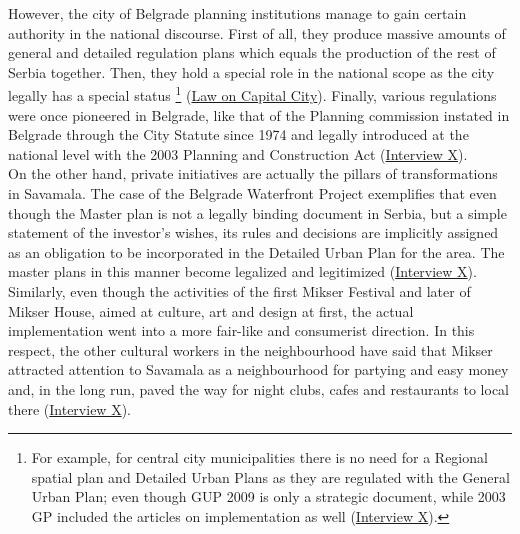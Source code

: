 \documentclass[11pt]{report}
\begin{document}
However, the city of Belgrade planning institutions manage to gain certain authority in the national discourse.
First of all, they produce massive amounts of general and detailed regulation plans which equals the production of the rest of Serbia together.
Then, they hold a special role in the national scope as the city legally has a special status
\footnote
{For example, for central city municipalities there is no need for a Regional spatial plan and Detailed Urban Plans as they are regulated with the General Urban Plan; even though GUP 2009 is only a strategic document, while 2003 GP included the articles on implementation as well (\href{InterviewX}{Interview X}).}
(\href{ref}{Law on Capital City}).
Finally, various regulations were once pioneered in Belgrade, like that of the Planning commission instated in Belgrade through the City Statute since 1974 and legally introduced at the national level with the 2003 Planning and Construction Act (\href{InterviewX}{Interview X}).
\\

On the other hand, private initiatives are actually the pillars of transformations in Savamala. The case of the Belgrade Waterfront Project exemplifies that even though the Master plan is not a legally binding document in Serbia, but a simple statement of the investor’s wishes, its rules and decisions are implicitly assigned as an obligation to be incorporated in the Detailed Urban Plan for the area. The master plans in this manner become legalized and legitimized (\href{InterviewX}{Interview X}).
\\

Similarly, even though the activities of the first Mikser Festival and later of Mikser House, aimed at culture, art and design at first, the actual implementation went into a more fair-like   and consumerist direction. In this respect, the other cultural workers in the neighbourhood have said that Mikser attracted attention to Savamala as a neighbourhood for partying and easy money and, in the long run, paved the way for night clubs, cafes and restaurants to local there
(\href{InterviewX}{Interview X}).
\\
\end{document}
